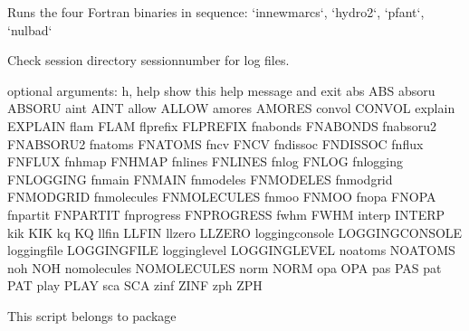 \documentclass[letterpaper,10pt,english]{sphinxmanual}
\begin{document}
\begin{sphinxVerbatim}[commandchars=\\\{\}]
Runs the four Fortran binaries in sequence: {}`innewmarcs{}`, {}`hydro2{}`, {}`pfant{}`, {}`nulbad{}`

Check session directory \PYGZdq{}session\PYGZhy{}\PYGZlt{}number\PYGZgt{}\PYGZdq{} for log files.

optional arguments:
  \PYGZhy{}h, \PYGZhy{}\PYGZhy{}help            show this help message and exit
  \PYGZhy{}\PYGZhy{}abs ABS
  \PYGZhy{}\PYGZhy{}absoru ABSORU
  \PYGZhy{}\PYGZhy{}aint AINT
  \PYGZhy{}\PYGZhy{}allow ALLOW
  \PYGZhy{}\PYGZhy{}amores AMORES
  \PYGZhy{}\PYGZhy{}convol CONVOL
  \PYGZhy{}\PYGZhy{}explain EXPLAIN
  \PYGZhy{}\PYGZhy{}flam FLAM
  \PYGZhy{}\PYGZhy{}flprefix FLPREFIX
  \PYGZhy{}\PYGZhy{}fn\PYGZus{}abonds FN\PYGZus{}ABONDS
  \PYGZhy{}\PYGZhy{}fn\PYGZus{}absoru2 FN\PYGZus{}ABSORU2
  \PYGZhy{}\PYGZhy{}fn\PYGZus{}atoms FN\PYGZus{}ATOMS
  \PYGZhy{}\PYGZhy{}fn\PYGZus{}cv FN\PYGZus{}CV
  \PYGZhy{}\PYGZhy{}fn\PYGZus{}dissoc FN\PYGZus{}DISSOC
  \PYGZhy{}\PYGZhy{}fn\PYGZus{}flux FN\PYGZus{}FLUX
  \PYGZhy{}\PYGZhy{}fn\PYGZus{}hmap FN\PYGZus{}HMAP
  \PYGZhy{}\PYGZhy{}fn\PYGZus{}lines FN\PYGZus{}LINES
  \PYGZhy{}\PYGZhy{}fn\PYGZus{}log FN\PYGZus{}LOG
  \PYGZhy{}\PYGZhy{}fn\PYGZus{}logging FN\PYGZus{}LOGGING
  \PYGZhy{}\PYGZhy{}fn\PYGZus{}main FN\PYGZus{}MAIN
  \PYGZhy{}\PYGZhy{}fn\PYGZus{}modeles FN\PYGZus{}MODELES
  \PYGZhy{}\PYGZhy{}fn\PYGZus{}modgrid FN\PYGZus{}MODGRID
  \PYGZhy{}\PYGZhy{}fn\PYGZus{}molecules FN\PYGZus{}MOLECULES
  \PYGZhy{}\PYGZhy{}fn\PYGZus{}moo FN\PYGZus{}MOO
  \PYGZhy{}\PYGZhy{}fn\PYGZus{}opa FN\PYGZus{}OPA
  \PYGZhy{}\PYGZhy{}fn\PYGZus{}partit FN\PYGZus{}PARTIT
  \PYGZhy{}\PYGZhy{}fn\PYGZus{}progress FN\PYGZus{}PROGRESS
  \PYGZhy{}\PYGZhy{}fwhm FWHM
  \PYGZhy{}\PYGZhy{}interp INTERP
  \PYGZhy{}\PYGZhy{}kik KIK
  \PYGZhy{}\PYGZhy{}kq KQ
  \PYGZhy{}\PYGZhy{}llfin LLFIN
  \PYGZhy{}\PYGZhy{}llzero LLZERO
  \PYGZhy{}\PYGZhy{}logging\PYGZus{}console LOGGING\PYGZus{}CONSOLE
  \PYGZhy{}\PYGZhy{}logging\PYGZus{}file LOGGING\PYGZus{}FILE
  \PYGZhy{}\PYGZhy{}logging\PYGZus{}level LOGGING\PYGZus{}LEVEL
  \PYGZhy{}\PYGZhy{}no\PYGZus{}atoms NO\PYGZus{}ATOMS
  \PYGZhy{}\PYGZhy{}no\PYGZus{}h NO\PYGZus{}H
  \PYGZhy{}\PYGZhy{}no\PYGZus{}molecules NO\PYGZus{}MOLECULES
  \PYGZhy{}\PYGZhy{}norm NORM
  \PYGZhy{}\PYGZhy{}opa OPA
  \PYGZhy{}\PYGZhy{}pas PAS
  \PYGZhy{}\PYGZhy{}pat PAT
  \PYGZhy{}\PYGZhy{}play PLAY
  \PYGZhy{}\PYGZhy{}sca SCA
  \PYGZhy{}\PYGZhy{}zinf ZINF
  \PYGZhy{}\PYGZhy{}zph ZPH
\end{sphinxVerbatim}

This script belongs to package 
\end{document}
